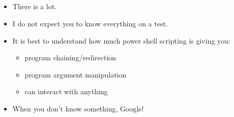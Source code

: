 \documentclass{beamer}
\begin{document}
\subsection{}

\begin{frame}{}
\begin{itemize}
\item There is a lot.
\item I do not expect you to know everything on a test.
\item It is best to understand how much power shell scripting is giving you:
\begin{itemize}
\item program chaining/redirection
\item program argument manipulation
\item can interact with anything
\end{itemize}
\item When you don't know something, Google!
\end{itemize}
\end{frame}
\end{document}
